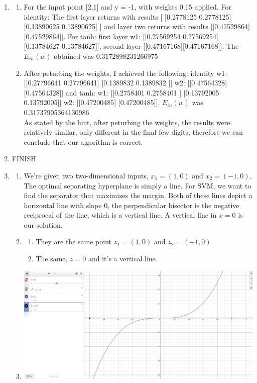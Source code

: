 \documentclass{article}
\begin{document}
    \begin{enumerate}
        \item \begin{enumerate}[label=(\alph*)]
            \item For the input point [2,1] and y = -1, with weights 0.15 applied. For identity: The first layer returns with results [ [0.2778125  0.2778125] [0.13890625 0.13890625] ] and layer two returns with results [[0.47529864] [0.47529864]]. For tanh: first layer w1: [[0.27569254 0.27569254][0.13784627 0.13784627]], second layer [[0.47167168][0.47167168]]. The $E_{in}(w)$ obtained was $0.3172898231266975$
            \item After peturbing the weights, I achieved the following: identity w1: [[0.27796641 0.27796641]
            [0.1389832  0.1389832 ]]
           w2: [[0.47564328]
            [0.47564328]] and tanh: w1: [[0.2758401  0.2758401 ]
            [0.13792005 0.13792005]]
           w2: [[0.47200485]
            [0.47200485]]. $E_{in}(w)$ was 0.31737905364130986\\[0.25in]
            As stated by the hint, after peturbing the weights, the results were relatively similar, only different in the final few digits, therefore we can conclude that our algorithm is correct.
        \end{enumerate}
        \item FINISH
        \item \begin{enumerate}[label=(\alph*)]
            \item We're given two two-dimensional inputs, $x_1 = (1,0)$ and $x_2 = (-1,0)$. The optimal separating hyperplane is simply a line. For SVM, we want to find the separator that maximizes the margin. Both of these lines depict a horizontal line with slope 0, the perpendicular bisector is the negative reciprocal of the line, which is a vertical line. A vertical line in $x = 0$ is our solution.
            \item \begin{enumerate}[label=(\roman*)]
                \item They are the same point $z_1 = (1,0)$ and $z_2 = (-1,0)$
                \item The same, $z = 0$ and it's a vertical line.
            \end{enumerate}
            \item \includegraphics[scale=0.25]{images/3c.png}

\end{enumerate}
\end{enumerate}
\end{document}
